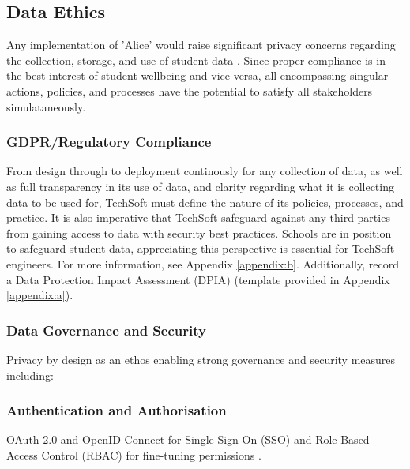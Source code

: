 \documentclass[14pt,a4paper]{article}
\begin{document}
\begin{multicols}{2}

\subsection{Data Ethics}
Any implementation of 'Alice' would raise significant privacy concerns regarding the collection, storage, and use of student data \textit{\parencite[pp. 366-370]{Annus2023}}.
Since proper compliance is in the best interest of student wellbeing and vice versa, all-encompassing singular actions, policies, and processes have the potential to satisfy all stakeholders simulataneously.

\subsubsection{GDPR/Regulatory Compliance}
From design through to deployment continously for any collection of data, as well as full transparency in its use of data, and clarity regarding what it is collecting data to be used for, TechSoft must define the nature of its policies, processes, and practice. It is also imperative that TechSoft safeguard against any third-parties from gaining access to data with security best practices. Schools are in position to safeguard student data, appreciating this perspective is essential for TechSoft engineers. For more information, see Appendix \ref{appendix:b}. Additionally, record a Data Protection Impact Assessment (DPIA) (template provided in Appendix \ref{appendix:a}).

\subsubsection{Data Governance and Security}
Privacy by design as an ethos enabling strong governance and security measures including:

\subsubsection*{Authentication and Authorisation}
OAuth 2.0 and OpenID Connect for Single Sign-On (SSO) and Role-Based Access Control (RBAC) for fine-tuning permissions \textit{\parencite[pp. 80-120]{Josuttis2023}}.


\end{multicols}
\end{document}
